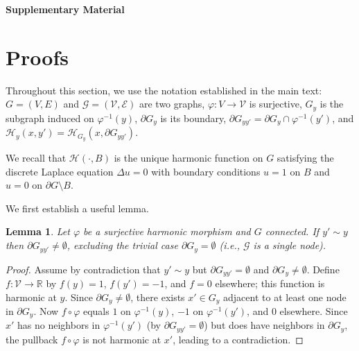 \documentclass[twocolumn,superscriptaddress,tightenlines,aps,prx,floatfix]{revtex4-2}
\newtheorem{lemma}{Lemma}
\begin{document}
\begin{bibunit}
\clearpage
\onecolumngrid
\setcounter{figure}{0}
\setcounter{table}{0}
\setcounter{equation}{0}
\setcounter{page}{1}
\setcounter{section}{0}

\makeatletter
\renewcommand{\thesection}{S\arabic{section}}
\renewcommand{\thesubsection}{\thesection.\arabic{subsection}}
\renewcommand{\thesubsubsection}{\thesubsection.\arabic{subsubsection}}
\renewcommand{\thefigure}{S\arabic{figure}}
\renewcommand{\theequation}{S\arabic{equation}}
\renewcommand{\thetable}{S\arabic{table}}

\begin{center}
	\textbf{\large Supplementary Material}
\end{center}

\section{Proofs}
\label{sec:proofs_sm}

Throughout this section, we use the notation established in the main text: $G=(V,E)$ and $\mathcal{G}=(\mathcal{V},\mathcal{E})$ are two graphs, $\varphi: V \to \mathcal{V}$ is surjective, $G_y$ is the subgraph induced on $\varphi^{-1}(y)$, $\partial G_y$ is its boundary, $\partial G_{yy'} = \partial G_y \cap \varphi^{-1}(y')$, and $\mathcal{H}_y(x, y') = \mathcal{H}_{G_y}(x, \partial G_{yy'})$.

We recall that $\mathcal{H}(\cdot, B)$ is the unique harmonic function on $G$ satisfying the discrete Laplace equation $\Delta u = 0$ with boundary conditions $u = 1$ on $B$ and $u = 0$ on $\partial G \setminus B$.

We first establish a useful lemma.

\begin{lemma}
\label{lem:nonempty_boundary}
Let $\varphi$ be a surjective harmonic morphism and $G$ connected. If $y' \sim y$ then $\partial G_{yy'} \neq \emptyset$, excluding the trivial case $\partial G_y = \emptyset$ (i.e., $\mathcal{G}$ is a single node).
\end{lemma}

\begin{proof}
Assume by contradiction that $y' \sim y$ but $\partial G_{yy'} = \emptyset$ and $\partial G_y \neq \emptyset$. Define $f: \mathcal{V} \to \mathbb{R}$ by $f(y) = 1$, $f(y') = -1$, and $f = 0$ elsewhere; this function is harmonic at $y$. Since $\partial G_y \neq \emptyset$, there exists $x' \in G_y$ adjacent to at least one node in $\partial G_y$. Now $f \circ \varphi$ equals $1$ on $\varphi^{-1}(y)$, $-1$ on $\varphi^{-1}(y')$, and $0$ elsewhere. Since $x'$ has no neighbors in $\varphi^{-1}(y')$ (by $\partial G_{yy'} = \emptyset$) but does have neighbors in $\partial G_y$, the pullback $f \circ \varphi$ is not harmonic at $x'$, leading to a contradiction.
\end{proof}



\end{bibunit}
\end{document}
